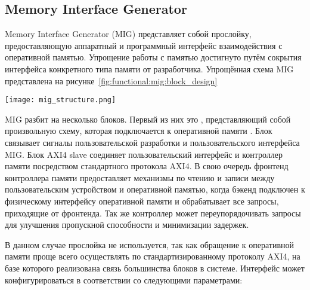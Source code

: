 \subsection{Memory Interface Generator}
\label{sec:functional:mig}

Memory Interface Generator (MIG) представляет собой прослойку, предоставляющую аппаратный и программный
интерфейс взаимодействия с оперативной памятью. Упрощение работы с памятью достигнуто путём сокрытия
интерфейса конкретного типа памяти от разработчика. Упрощённая схема MIG представлена на рисунке~\ref{fig:functional:mig:block_design}

\begin{center}
  \centering
  \texttt{[image: mig\_structure.png]}
  \label{fig:functional:mig:block_design}
\end{center}

MIG разбит на несколько блоков. Первый из них это , представляющий
собой произвольную схему, которая подключается к оперативной памяти . Блок связывает
сигналы пользовательской разработки и пользовательского интерфейса MIG. Блок AXI4 slave
соединяет пользовательский интерфейс и контроллер памяти посредством стандартного протокола
AXI4. В свою очередь фронтенд контроллера памяти предоставляет механизмы по чтению и записи
между пользовательским устройством и оперативной памятью, когда бэкенд подключен к физическому
интерфейсу оперативной памяти и обрабатывает все запросы, приходящие от фронтенда. Так же
контроллер может переупорядочивать запросы для улучшения пропускной способности и минимизации
задержек.

В данном случае прослойка  не используется, так как обращение к оперативной памяти
проще всего осуществлять по стандартизированному протоколу AXI4, на базе которого реализована связь
большинства блоков в системе. Интерфейс может конфигурироваться в соответствии со следующими
параметрами:

